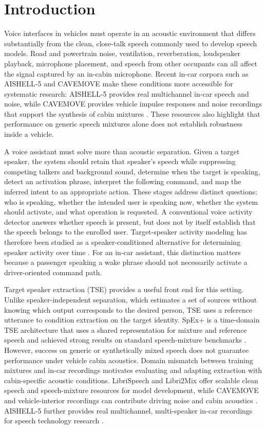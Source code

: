 \section{Introduction}
\label{sec:introduction}

Voice interfaces in vehicles must operate in an acoustic environment that differs substantially from the clean, close-talk speech commonly used to develop speech models. Road and powertrain noise, ventilation, reverberation, loudspeaker playback, microphone placement, and speech from other occupants can all affect the signal captured by an in-cabin microphone. Recent in-car corpora such as AISHELL-5 and CAVEMOVE make these conditions more accessible for systematic research: AISHELL-5 provides real multichannel in-car speech and noise, while CAVEMOVE provides vehicle impulse responses and noise recordings that support the synthesis of cabin mixtures \cite{aishell5,cavemove}. These resources also highlight that performance on generic speech mixtures alone does not establish robustness inside a vehicle.

A voice assistant must solve more than acoustic separation. Given a target speaker, the system should retain that speaker's speech while suppressing competing talkers and background sound, determine when the target is speaking, detect an activation phrase, interpret the following command, and map the inferred intent to an appropriate action. These stages address distinct questions: who is speaking, whether the intended user is speaking now, whether the system should activate, and what operation is requested. A conventional voice activity detector answers whether speech is present, but does not by itself establish that the speech belongs to the enrolled user. Target-speaker activity modeling has therefore been studied as a speaker-conditioned alternative for determining speaker activity over time \cite{tsvad}. For an in-car assistant, this distinction matters because a passenger speaking a wake phrase should not necessarily activate a driver-oriented command path.

Target speaker extraction (TSE) provides a useful front end for this setting. Unlike speaker-independent separation, which estimates a set of sources without knowing which output corresponds to the desired person, TSE uses a reference utterance to condition extraction on the target identity. SpEx+ is a time-domain TSE architecture that uses a shared representation for mixture and reference speech and achieved strong results on standard speech-mixture benchmarks \cite{spexplus}. However, success on generic or synthetically mixed speech does not guarantee performance under vehicle cabin acoustics. Domain mismatch between training mixtures and in-car recordings motivates evaluating and adapting extraction with cabin-specific acoustic conditions. LibriSpeech and Libri2Mix offer scalable clean speech and speech-mixture resources for model development, while CAVEMOVE and vehicle-interior recordings can contribute driving noise and cabin acoustics \cite{librispeech,librimix,cavemove,visdataset}. AISHELL-5 further provides real multichannel, multi-speaker in-car recordings for speech technology research \cite{aishell5}.

